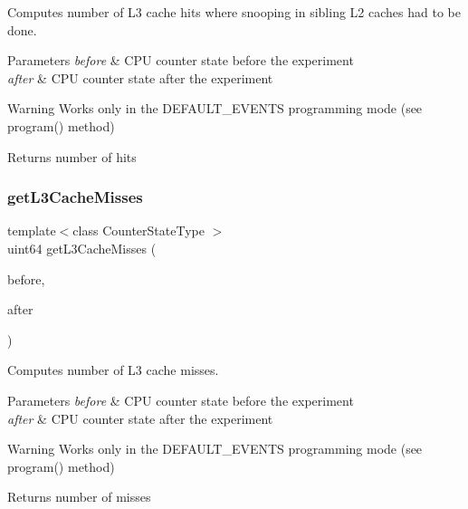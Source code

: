 Computes number of L3 cache hits where snooping in sibling L2 caches had to be done. 


\begin{DoxyParams}{Parameters}
{\em before} & C\+PU counter state before the experiment \\
\hline
{\em after} & C\+PU counter state after the experiment \\
\hline
\end{DoxyParams}
\begin{DoxyWarning}{Warning}
Works only in the D\+E\+F\+A\+U\+L\+T\+\_\+\+E\+V\+E\+N\+TS programming mode (see program() method) 
\end{DoxyWarning}
\begin{DoxyReturn}{Returns}
number of hits 
\end{DoxyReturn}
\mbox{\label{class_basic_counter_state_a94118e70266db2ed7fc6b8b7b4e2c343}} 
\subsubsection{\texorpdfstring{get\+L3\+Cache\+Misses}{getL3CacheMisses}}
{\footnotesize\ttfamily template$<$class Counter\+State\+Type $>$ \\
uint64 get\+L3\+Cache\+Misses (\begin{DoxyParamCaption}\item[{const Counter\+State\+Type \&}]{before,  }\item[{const Counter\+State\+Type \&}]{after }\end{DoxyParamCaption})\hspace{0.3cm}{\ttfamily [friend]}}



Computes number of L3 cache misses. 


\begin{DoxyParams}{Parameters}
{\em before} & C\+PU counter state before the experiment \\
\hline
{\em after} & C\+PU counter state after the experiment \\
\hline
\end{DoxyParams}
\begin{DoxyWarning}{Warning}
Works only in the D\+E\+F\+A\+U\+L\+T\+\_\+\+E\+V\+E\+N\+TS programming mode (see program() method) 
\end{DoxyWarning}
\begin{DoxyReturn}{Returns}
number of misses 
\end{DoxyReturn}
\mbox{\label{class_basic_counter_state_a185f850a9a753d9cf4deb8299261fd4c}} 
